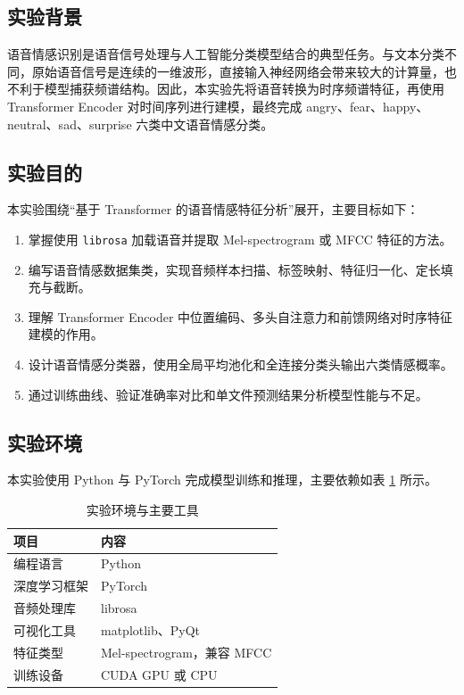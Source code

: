 \documentclass[UTF8,12pt,a4paper]{ctexart}
\begin{document}
\subsection{实验背景}
语音情感识别是语音信号处理与人工智能分类模型结合的典型任务。与文本分类不同，原始语音信号是连续的一维波形，直接输入神经网络会带来较大的计算量，也不利于模型捕获频谱结构。因此，本实验先将语音转换为时序频谱特征，再使用 Transformer Encoder 对时间序列进行建模，最终完成 angry、fear、happy、neutral、sad、surprise 六类中文语音情感分类。

\subsection{实验目的}
本实验围绕“基于 Transformer 的语音情感特征分析”展开，主要目标如下：
\begin{enumerate}
    \item 掌握使用 \texttt{librosa} 加载语音并提取 Mel-spectrogram 或 MFCC 特征的方法。
    \item 编写语音情感数据集类，实现音频样本扫描、标签映射、特征归一化、定长填充与截断。
    \item 理解 Transformer Encoder 中位置编码、多头自注意力和前馈网络对时序特征建模的作用。
    \item 设计语音情感分类器，使用全局平均池化和全连接分类头输出六类情感概率。
    \item 通过训练曲线、验证准确率对比和单文件预测结果分析模型性能与不足。
\end{enumerate}

\subsection{实验环境}
本实验使用 Python 与 PyTorch 完成模型训练和推理，主要依赖如表 \ref{tab:env} 所示。

\begin{table}[H]
\centering
\caption{实验环境与主要工具}
\label{tab:env}
\begin{tabular}{>{\centering\arraybackslash}p{3.5cm}>{\centering\arraybackslash}p{8.5cm}}
\toprule
项目 & 内容 \\
\midrule
编程语言 & Python \\
深度学习框架 & PyTorch \\
音频处理库 & librosa \\
可视化工具 & matplotlib、PyQt \\
特征类型 & Mel-spectrogram，兼容 MFCC \\
训练设备 & CUDA GPU 或 CPU \\
\bottomrule
\end{tabular}
\end{table}
\end{document}
